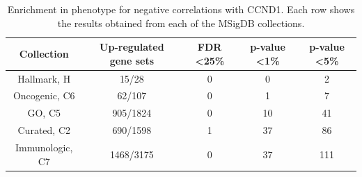 \begin{table}[h!]
    \begin{tabular}{ccccc}
    \hline
    Collection      & Up-regulated gene sets & FDR \textless 25\% & p-value \textless 1\% & p-value \textless 5\% \\ \hline
    Hallmark, H     & 15/28                  & 0                                 & 0                                    & 2                                    \\
    Oncogenic, C6   & 62/107                 & 0                                 & 1                                    & 7                                    \\
    GO, C5          & 905/1824               & 0                                 & 10                                   & 41                                   \\
    Curated, C2     & 690/1598               & 1                                 & 37                                   & 86                                   \\
    Immunologic, C7 & 1468/3175              & 0                                 & 37                                   & 111                                  \\ \hline
    \end{tabular}%
    \caption{Enrichment in phenotype for negative correlations with CCND1. Each row shows the results obtained from each of the MSigDB collections.}
    \label{enr_ph_negative}
    \end{table}


